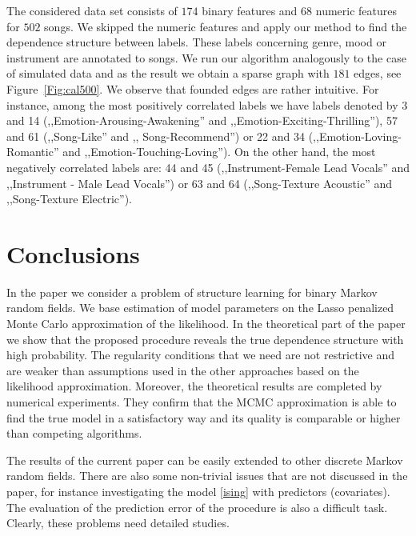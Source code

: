 \documentclass[twoside,11pt]{article}
\begin{document}
 The considered data set consists of $174$ binary features and $68$ numeric features for $502$ songs. We skipped 
the numeric features and apply our method to find the dependence structure between labels. These 
labels concerning genre, mood or instrument are annotated to songs.
We run our algorithm analogously to the case of simulated data and as the result
we obtain a sparse graph with $181$ edges, see Figure~\ref{Fig:cal500}. We observe that founded edges are rather intuitive. For instance, among the most positively correlated labels we have labels denoted by 3 and 14 (,,Emotion-Arousing-Awakening'' and ,,Emotion-Exciting-Thrilling''),
57 and 61 (,,Song-Like'' and ,, Song-Recommend'') or 22 and 34 (,,Emotion-Loving-Romantic'' and ,,Emotion-Touching-Loving''). On the other hand, the most negatively correlated labels are: 44 and 45 (,,Instrument-Female Lead Vocals'' and ,,Instrument - Male Lead Vocals'') or 63 and 64 
(,,Song-Texture Acoustic'' and ,,Song-Texture Electric'').


\section{Conclusions}\label{conclusions}

In the  paper we consider a problem of structure learning for binary Markov random fields. 
We base estimation of model parameters on the Lasso penalized Monte Carlo approximation
of the likelihood. In the theoretical part of the paper  we show that the proposed procedure reveals the true dependence structure with high probability.
The regularity conditions that we need are not restrictive and are weaker than assumptions used in the other approaches based on the likelihood approximation. 
Moreover, the theoretical results are completed by numerical experiments.
They confirm that the MCMC approximation is able to find the true model in a satisfactory way 
and its quality is comparable or higher than competing algorithms. 

The results of the current paper can be easily extended to other discrete Markov random 
fields. There are also some non-trivial issues that are not discussed in the paper, for instance investigating the model \eqref{ising} with predictors (covariates). The evaluation of the prediction error of the procedure is also a difficult task. Clearly, these  problems need detailed studies.



\end{document}
